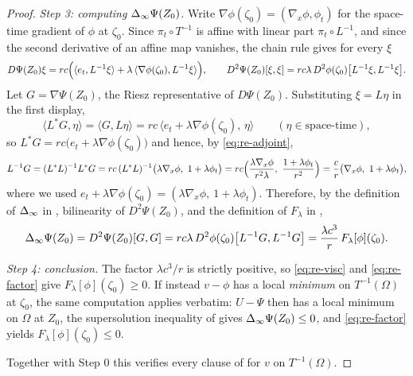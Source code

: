 \begin{proof}
\emph{Step 3: computing $\Delta_{\infty}\Psi(Z_0)$.}
Write $\nabla\phi(\zeta_0)=(\nabla_x\phi,\phi_t)$ for the space-time gradient of
$\phi$ at $\zeta_0$. Since $\pi_t\circ T^{-1}$ is affine with linear part
$\pi_t\circ L^{-1}$, and since the second derivative of an affine map vanishes,
the chain rule gives for every $\xi$
\[
  D\Psi(Z_0)\xi=rc\Bigl(\langle e_t,L^{-1}\xi\rangle
     +\lambda\,\langle\nabla\phi(\zeta_0),L^{-1}\xi\rangle\Bigr),
  \qquad
  D^2\Psi(Z_0)[\xi,\xi]=rc\lambda\,D^2\phi(\zeta_0)\bigl[L^{-1}\xi,L^{-1}\xi\bigr].
\]
Let $G=\nabla\Psi(Z_0)$, the Riesz representative of $D\Psi(Z_0)$. Substituting
$\xi=L\eta$ in the first display,
\[
  \langle L^*G,\eta\rangle=\langle G,L\eta\rangle
   =rc\,\bigl\langle e_t+\lambda\nabla\phi(\zeta_0),\,\eta\bigr\rangle
   \qquad(\eta\in\text{space-time}),
\]
so $L^*G=rc\bigl(e_t+\lambda\nabla\phi(\zeta_0)\bigr)$ and hence, by
\eqref{eq:re-adjoint},
\[
  L^{-1}G=(L^*L)^{-1}L^*G
   =rc\,(L^*L)^{-1}\bigl(\lambda\nabla_x\phi,\ 1+\lambda\phi_t\bigr)
   =rc\Bigl(\frac{\lambda\nabla_x\phi}{r^2\lambda},\ \frac{1+\lambda\phi_t}{r^2}\Bigr)
   =\frac cr\bigl(\nabla_x\phi,\ 1+\lambda\phi_t\bigr),
\]
where we used
$e_t+\lambda\nabla\phi(\zeta_0)=(\lambda\nabla_x\phi,\ 1+\lambda\phi_t)$.
Therefore, by the definition of $\Delta_{\infty}$ in , bilinearity of
$D^2\Psi(Z_0)$, and the definition of $F_\lambda$ in ,
\begin{equation}\label{eq:re-factor}
  \Delta_{\infty}\Psi(Z_0)=D^2\Psi(Z_0)[G,G]
   =rc\lambda\,D^2\phi(\zeta_0)\bigl[L^{-1}G,L^{-1}G\bigr]
   =\frac{\lambda c^3}{r}\,F_\lambda[\phi](\zeta_0).
\end{equation}

\emph{Step 4: conclusion.}
The factor $\lambda c^3/r$ is strictly positive, so \eqref{eq:re-visc} and
\eqref{eq:re-factor} give $F_\lambda[\phi](\zeta_0)\ge0$. If instead
$v-\phi$ has a local \emph{minimum} on $T^{-1}(\Omega)$ at $\zeta_0$, the same
computation applies verbatim: $U-\Psi$ then has a local minimum on $\Omega$ at
$Z_0$, the supersolution inequality of  gives
$\Delta_{\infty}\Psi(Z_0)\le0$, and \eqref{eq:re-factor} yields
$F_\lambda[\phi](\zeta_0)\le0$.

Together with Step 0 this verifies every clause of
 for $v$ on $T^{-1}(\Omega)$.
\end{proof}
